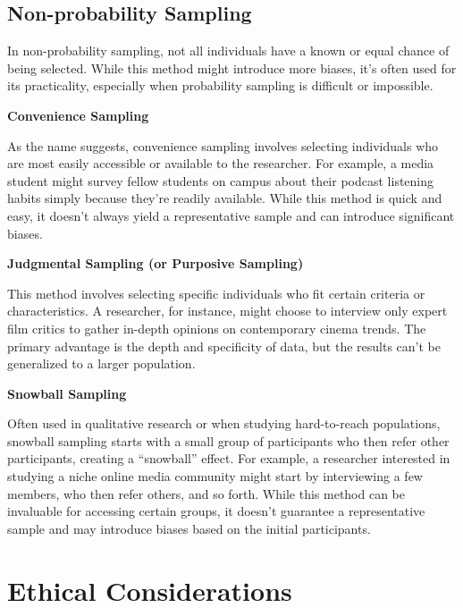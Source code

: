 \documentclass[
  b5paper]{book}
\begin{document}
\hypertarget{non-probability-sampling}{%
\subsection*{Non-probability Sampling}\label{non-probability-sampling}}

In non-probability sampling, not all individuals have a known or equal chance of being selected. While this method might introduce more biases, it's often used for its practicality, especially when probability sampling is difficult or impossible.

\textbf{Convenience Sampling}

As the name suggests, convenience sampling involves selecting individuals who are most easily accessible or available to the researcher. For example, a media student might survey fellow students on campus about their podcast listening habits simply because they're readily available. While this method is quick and easy, it doesn't always yield a representative sample and can introduce significant biases.

\textbf{Judgmental Sampling (or Purposive Sampling)}

This method involves selecting specific individuals who fit certain criteria or characteristics. A researcher, for instance, might choose to interview only expert film critics to gather in-depth opinions on contemporary cinema trends. The primary advantage is the depth and specificity of data, but the results can't be generalized to a larger population.

\textbf{Snowball Sampling}

Often used in qualitative research or when studying hard-to-reach populations, snowball sampling starts with a small group of participants who then refer other participants, creating a ``snowball'' effect. For example, a researcher interested in studying a niche online media community might start by interviewing a few members, who then refer others, and so forth. While this method can be invaluable for accessing certain groups, it doesn't guarantee a representative sample and may introduce biases based on the initial participants.

\hypertarget{ethical-considerations-5}{%
\section{Ethical Considerations}\label{ethical-considerations-5}}
\end{document}
